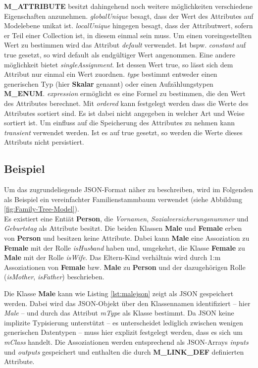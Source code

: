 \textbf{M\_ATTRIBUTE} besitzt dahingehend noch weitere m\"oglichkeiten verschiedene Eigenschaften anzunehmen. \textit{globalUnique} besagt, dass der Wert des Attributes auf Modelebene unikat ist. \textit{localUnique} hingegen besagt, dass der Attributwert, sofern er Teil einer Collection ist, in diesem einmal sein muss. Um einen voreingestellten Wert zu bestimmen wird das Attribut \textit{default} verwendet. Ist bspw. \textit{constant} auf true gesetzt, so wird default als endg\"ultiger Wert angenommen. Eine andere m\"oglichkeit bietet \textit{singleAssignment}. Ist dessen Wert true, so lässt sich dem Attribut nur einmal ein Wert zuordnen. \textit{type} bestimmt entweder einen generischen Typ (hier \textbf{Skalar} genannt) oder einen Aufz\"ahlungstypen \textbf{M\_ENUM}. \textit{expression} erm\"oglicht es eine Formel zu bestimmen, die den Wert des Attributes berechnet. Mit \textit{ordered} kann festgelegt werden dass die Werte des Attributes sortiert sind. Es ist dabei nicht angegeben in welcher Art und Weise sortiert ist. Um einfluss auf die Speicherung des Attributes zu nehmen kann \textit{transient} verwendet werden. Ist es auf true gesetzt, so werden die Werte dieses Attributs nicht persistiert. 


\subsection{Beispiel}
Um das zugrundeliegende JSON-Format n\"aher zu beschreiben, wird im Folgenden als Beispiel ein vereinfachter Familienstammbaum verwendet (siehe Abbildung \ref{fig:Family-Tree-Model}).\\ 
Es existiert eine Entiät \textbf{Person}, die \textit{Vornamen}, \textit{Sozialversicherungsnummer} und \textit{Geburtstag} als Attribute besitzt. Die beiden Klassen \textbf{Male} und \textbf{Female} erben von \textbf{Person} und besitzen keine Attribute. Dabei kann \textbf{Male} eine Assoziation zu \textbf{Female} mit der Rolle \textit{isHusband} haben und, umgekehrt, die Klasse \textbf{Female} zu \textbf{Male} mit der Rolle \textit{isWife}. Das Eltern-Kind verh\"altnis wird durch 1:m Assoziationen von \textbf{Female} bzw. \textbf{Male} zu \textbf{Person} und der dazugeh\"origen Rolle (\textit{isMother}, \textit{isFather}) beschrieben.



Die Klasse \textbf{Male} kann wie Listing \ref{lst:malejson} zeigt als JSON gespeichert werden. Dabei wird das JSON-Objekt \"uber den Klassennamen identifiziert -- hier \textit{Male} -- und durch das Attribut \textit{mType} als Klasse bestimmt. Da JSON keine implizite Typisierung unterstützt -- es unterscheidet lediglich zwischen wenigen generischen Datentypen -- muss hier explizit festgelegt werden, dass es sich um \textit{mClass} handelt. Die Assoziationen werden entsprechend als JSON-Arrays \textit{inputs} und \textit{outputs} gespeichert und enthalten die durch \textbf{M\_LINK\_DEF} definierten Attribute.

